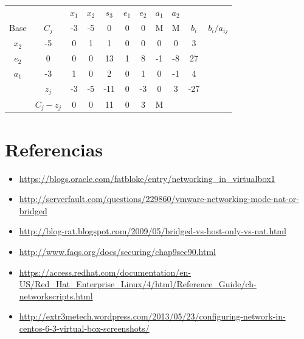 \documentclass[11pt]{article}
\begin{document}
\begin{table}[h]
\begin{tabular}{cc|ccccccc|cc|}
     &       & $x_1$ & $x_2$ & $s_3$ & $e_1$ & $e_2$ & $a_1$ & $a_2$ &     &        \\
Base & $C_j$    & -3 & -5 & 0   & 0  & 0  & M  & M  & $b_i$  & $b_i/a_{ij}$ \\ \hline
$x_2$   & -5    & 0  & 1  & 1   & 0  & 0  & 0  & 0  & 3   &        \\
$e_2$   & 0     & 0  & 0  & 13  & 1  & 8  & -1 & -8 & 27  &        \\
$a_1$   & -3    & 1  & 0  & 2   & 0  & 1  & 0  & -1 & 4   &        \\ \hline
     & $z_j$    & -3 & -5 & -11 & 0  & -3 & 0  & 3  & -27 &        \\
     & $C_j-z_j$ & 0  & 0  & 11  & 0  & 3  & M  &    &     &       
\end{tabular}
\end{table}


\section{Referencias}
	\begin{itemize}
		\item \url{https://blogs.oracle.com/fatbloke/entry/networking_in_virtualbox1}
		\item \url{http://serverfault.com/questions/229860/vmware-networking-mode-nat-or-bridged}
		\item \url{http://blog-rat.blogspot.com/2009/05/bridged-vs-host-only-vs-nat.html}
		\item \url{http://www.faqs.org/docs/securing/chap9sec90.html}
		\item \scriptsize \url{https://access.redhat.com/documentation/en-US/Red_Hat_Enterprise_Linux/4/html/Reference_Guide/ch-networkscripts.html}
		\item \scriptsize \url{http://extr3metech.wordpress.com/2013/05/23/configuring-network-in-centos-6-3-virtual-box-screenshots/}
	\end{itemize}
\end{document}
